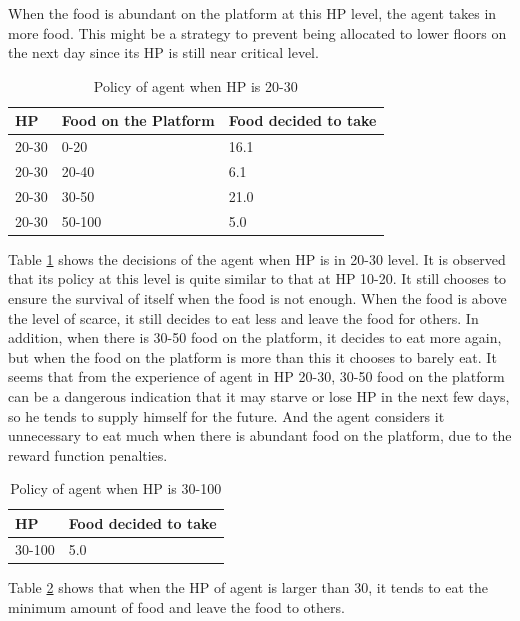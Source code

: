 When the food is abundant on the platform at this HP level, the agent takes in more food. This might be a strategy to prevent being allocated to lower floors on the next day since its HP is still near critical level.

\begin{table}[]
\centering
\caption{Policy of agent when HP is 20-30}
\label{2030-team2}
\begin{tabular}{@{}lll@{}}
\toprule
HP    & Food on the Platform & Food decided to take \\ \midrule
20-30 & 0-20                 & 16.1                 \\
20-30 & 20-40                & 6.1                  \\
20-30 & 30-50                & 21.0                 \\
20-30 & 50-100               & 5.0                  \\ \bottomrule
\end{tabular}
\end{table}

Table \ref{2030-team2} shows the decisions of the agent when HP is in 20-30 level. It is observed that its policy at this level is quite similar to that at HP 10-20. It still chooses to ensure the survival of itself when the food is not enough. When the food is above the level of scarce, it still decides to eat less and leave the food for others. In addition, when there is 30-50 food on the platform, it decides to eat more again, but when the food on the platform is more than this it chooses to barely eat. It seems that from the experience of agent in HP 20-30, 30-50 food on the platform can be a dangerous indication that it may starve or lose HP in the next few days, so he tends to supply himself for the future. And the agent considers it unnecessary to eat much when there is abundant food on the platform, due to the reward function penalties.

\begin{table}[]
\centering
\caption{Policy of agent when HP is 30-100}
\label{30100-team2}
\begin{tabular}{@{}ll@{}}
\toprule
HP     & Food decided to take \\ \midrule
30-100 & 5.0                  \\ \bottomrule
\end{tabular}
\end{table}

Table \ref{30100-team2} shows that when the HP of agent is larger than 30, it tends to eat the minimum amount of food and leave the food to others.

